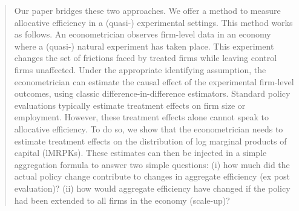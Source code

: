 \documentclass{tufte-handout}
\theoremstyle{break}
\begin{document}
\begin{fullwidth}
  \begin{quote}
    Our paper bridges these two approaches. We offer a method to measure allocative efficiency in a (quasi-) experimental settings. This method works as follows. An econometrician observes firm-level data in an economy where a (quasi-) natural experiment has taken place. This experiment changes the set of frictions faced by treated firms while leaving control firms unaffected. Under the appropriate identifying assumption, the econometrician can estimate the causal effect of the experimental firm-level outcomes, using classic difference-in-difference estimators. Standard policy evaluations typically estimate treatment effects on firm size or employment. However, these treatment effects alone cannot speak to allocative efficiency. To do so, we show that the econometrician needs to estimate treatment effects on the distribution of log marginal products of capital (lMRPKs). These estimates can then be injected in a simple aggregation formula to answer two simple questions: (i) how much did the actual policy change contribute to changes in aggregate efficiency (ex post evaluation)? (ii) how would aggregate efficiency have changed if the policy had been extended to all firms in the economy (scale-up)?
  \end{quote}
\end{fullwidth}




\end{document}
